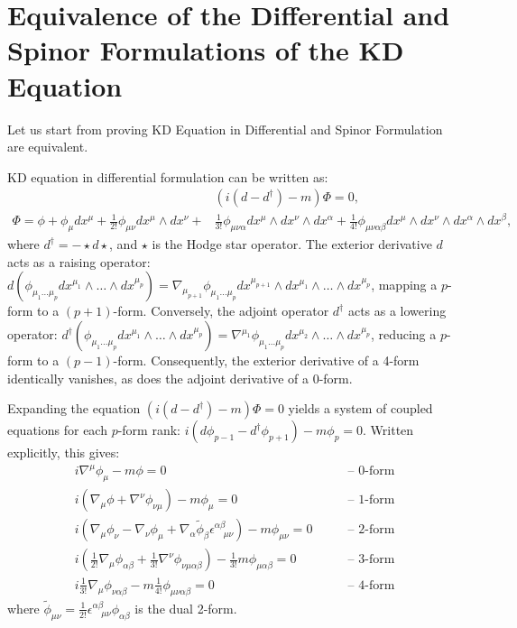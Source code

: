 \section{Equivalence of the Differential and Spinor Formulations of the KD Equation}\label{sec:KD_diff_to_spinor}

Let us start from proving KD Equation in Differential and Spinor Formulation are equivalent.

KD equation in differential formulation can be written as:
\begin{equation}
\begin{aligned}
    &(i(d - d^\dagger) - m)\Phi = 0,\\ 
    \Phi=\phi+\phi_\mu dx^\mu+\frac{1}{2!}\phi_{\mu\nu}dx^\mu \wedge dx^\nu+ &\frac{1}{3!}\phi_{\mu\nu\alpha}dx^\mu \wedge dx^\nu \wedge dx^\alpha +\frac{1}{4!}\phi_{\mu\nu\alpha\beta}dx^\mu\wedge dx^\nu\wedge dx^\alpha\wedge dx^\beta,
\end{aligned}
\end{equation}
where $d^\dagger=-\star d\star$, and $\star$ is the Hodge star operator. The exterior derivative $d$ acts as a raising operator: $d(\phi_{\mu_1...\mu_p}dx^{\mu_1}\wedge\dots \wedge dx^{\mu_p})=\nabla_\mu_{p+1} \phi_{\mu_1...\mu_p}dx^{\mu_{p+1}}\wedge dx^{\mu_1}\wedge\dots \wedge dx^{\mu_p}$, mapping a $p$-form to a $(p+1)$-form. Conversely, the adjoint operator $d^\dagger$ acts as a lowering operator: $d^\dagger(\phi_{\mu_1...\mu_p}dx^{\mu_1}\wedge\dots \wedge dx^{\mu_p})=\nabla^{\mu_1}\phi_{\mu_1...\mu_p}dx^{\mu_2}\wedge\dots \wedge dx^{\mu_p}$, reducing a $p$-form to a $(p-1)$-form. Consequently, the exterior derivative of a 4-form identically vanishes, as does the adjoint derivative of a 0-form. 

Expanding the equation $(i(d - d^\dagger) - m)\Phi=0$ yields a system of coupled equations for each $p$-form rank: 
$i(d\phi_{p-1}-d^\dagger \phi_{p+1})-m\phi_p=0$. Written explicitly, this gives:
\begin{equation}\label{eq:KD_eq_diff}
\begin{aligned}
    i\nabla^\mu\phi_\mu-m\phi=0 \qquad &\text{-- 0-form}\\
    i(\nabla_\mu\phi+\nabla^\nu\phi_{\nu\mu})-m\phi_\mu=0 \qquad &\text{-- 1-form}\\
    i(\nabla_\mu\phi_\nu-\nabla_\nu\phi_\mu+\nabla_\alpha\tilde \phi_{\beta}\epsilon^{\alpha\beta}_{\quad\mu\nu})-m\phi_{\mu\nu}=0 \qquad &\text{-- 2-form}\\
    i(\frac{1}{2!}\nabla_\mu\phi_{\alpha\beta}+\frac{1}{3!}\nabla^\nu\phi_{\nu\mu\alpha\beta})-\frac{1}{3!}m\phi_{\mu\alpha\beta}=0 \qquad &\text{-- 3-form}\\
    i\frac{1}{3!}\nabla_\mu\phi_{\nu\alpha\beta}-m\frac{1}{4!}\phi_{\mu\nu\alpha\beta}=0 \qquad &\text{-- 4-form}
\end{aligned}
\end{equation}
where $\tilde\phi_{\mu\nu}=\frac{1}{2!}\epsilon^{\alpha\beta}_{\quad\mu\nu}\phi_{\alpha\beta}$ is the dual 2-form.

